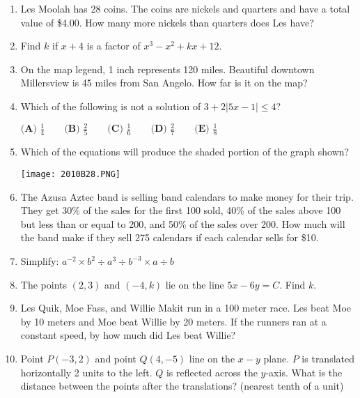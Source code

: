 \documentclass[../uilmath.tex]{subfiles}
\begin{document}
\begin{enumerate}[label=\bfseries\arabic*.]
        \item %
        Les Moolah has 28 coins. The coins are nickels and quarters and have a total value of \$4.00. How many more nickels than quarters does Les have?

        \item %
        Find $k$ if $x+4$ is a factor of $x^3-x^2+kx+12$.

        \item %
        On the map legend, 1 inch represents 120 miles. Beautiful downtown Millersview is 45 miles from San Angelo. How far is it on the map?

        \item %
        Which of the following is not a solution of $3+2|5x-1|\leq 4$?

        $\textbf{(A) } \frac{1}{4} \qquad \textbf{(B) } \frac{2}{5} \qquad \textbf{(C) } \frac{1}{6} \qquad \textbf{(D) } \frac{2}{7} \qquad \textbf{(E) }\frac{1}{8}$

        \item %
        Which of the equations will produce the shaded portion of the graph shown?
        \begin{center}
            \texttt{[image: 2010B28.PNG]}
        \end{center}

        \item %
        The Azusa Aztec band is selling band calendars to make money for their trip. They get 30\% of the sales for the first 100 sold,
        40\% of the sales above 100 but less than or equal to 200, and 50\% of the sales over 200. How much will the band make if they sell 275 calendars if each calendar sells for \$10.

        \item %
        Simplify: $a^{-2}\times b^2 \div a^3\div b^{-3}\times a\div b$

        \item %
        The points $(2,3)$ and $(-4,k)$ lie on the line $5x-6y=C$. Find $k$.

        \item %
        Les Quik, Moe Fass, and Willie Makit run in a 100 meter race. Les beat Moe by 10 meters and Moe beat Willie by 20 meters.
        If the runners ran at a constant speed, by how much did Les beat Willie?

        \item %
        Point $P(-3,2)$ and point $Q(4,-5)$ line on the $x-y$ plane. $P$ is translated horizontally 2 units to the left. $Q$ is reflected 
        across the $y$-axis. What is the distance between the points after the translations? (nearest tenth of a unit)


\end{enumerate}
\end{document}
